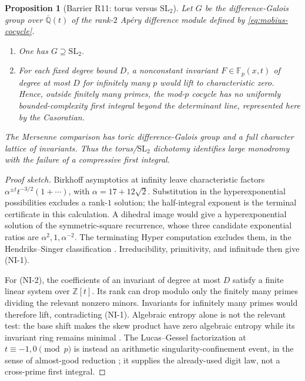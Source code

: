 \documentclass[11pt]{amsart}
\theoremstyle{plain}
\newtheorem{proposition}{Proposition}
\theoremstyle{remark}
\begin{document}
\begin{proposition}[Barrier R11: torus versus $\mathrm{SL}_2$]
\label{prop:barrier-dynamical}
Let $G$ be the difference-Galois group over $\overline{\mathbb Q}(t)$
of the rank-$2$ Ap\'ery difference module defined by
\eqref{eq:mobius-cocycle}.
\begin{enumerate}
\item[(NI-1)] One has $G\supseteq\mathrm{SL}_2$.
\item[(NI-2)] For each fixed degree bound $D$, a nonconstant
invariant $F\in\mathbb F_p(x,t)$ of degree at most $D$ for infinitely
many $p$ would lift to characteristic zero.  Hence, outside finitely
many primes, the mod-$p$ cocycle has no uniformly bounded-complexity
first integral beyond the determinant line, represented here by the
Casoratian.
\end{enumerate}
The Mersenne comparison has toric difference-Galois group and a full
character lattice of invariants.  Thus the torus/$\mathrm{SL}_2$
dichotomy identifies large monodromy with the failure of a compressive
first integral.
\end{proposition}

\begin{proof}[Proof sketch]
Birkhoff asymptotics at infinity leave characteristic factors
$\alpha^{\pm t}t^{-3/2}(1+\cdots)$, with
$\alpha=17+12\sqrt2$.  Substitution in the hyperexponential
possibilities excludes a rank-$1$ solution; the half-integral exponent
is the terminal certificate in this calculation.  A dihedral image
would give a hyperexponential solution of the symmetric-square
recurrence, whose three candidate exponential ratios are
$\alpha^2,1,\alpha^{-2}$.  The terminating Hyper computation excludes
them, in the Hendriks--Singer classification
\cite{HendriksSinger1999}.  Irreducibility, primitivity, and infinitude
then give (NI-1).

For (NI-2), the coefficients of an invariant of degree at most $D$
satisfy a finite linear system over $\mathbb Z[t]$.  Its rank can drop
modulo only the finitely many primes dividing the relevant nonzero
minors.  Invariants for infinitely many primes would therefore lift,
contradicting (NI-1).  Algebraic entropy alone is not the relevant
test: the base shift makes the skew product have zero algebraic entropy
while its invariant ring remains minimal
\cite{BellonViallet1999}.  The Lucas--Gessel factorization at
$t\equiv-1,0\pmod p$ is instead an arithmetic singularity-confinement
event, in the sense of almost-good reduction
\cite{KankiMadaTokihiro2013}; it supplies the already-used digit law,
not a cross-prime first integral.
\end{proof}
\end{document}
